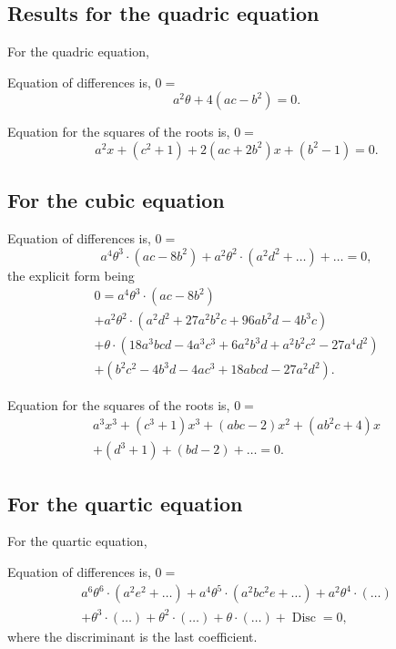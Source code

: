 \documentclass[11pt,a4paper]{article}
\theoremstyle{definition}
\DeclareMathOperator{\Disc}{Disc}
\begin{document}
\subsection*{Results for the quadric equation}

For the quadric equation,

Equation of differences is, $0=$
\[
a^2\theta+4(ac-b^2)=0.
\]

Equation for the squares of the roots is, $0=$
\[
a^2x+(c^2+1)+2(ac+2b^2)x+(b^2-1)=0.
\]

\subsection*{For the cubic equation}

Equation of differences is, $0=$
\[
a^4\theta^3\cdot(ac-8b^2)+a^2\theta^2\cdot(a^2d^2+\ldots)+\ldots=0,
\]
the explicit form being
\begin{multline*}
0=a^4\theta^3\cdot(ac-8b^2)\\
+a^2\theta^2\cdot(a^2d^2+27a^2b^2c+96ab^2d-4b^3c)\\
+\theta\cdot(18a^3bcd-4a^3c^3+6a^2b^3d+a^2b^2c^2-27a^4d^2)\\
+(b^2c^2-4b^3d-4ac^3+18abcd-27a^2d^2).
\end{multline*}

Equation for the squares of the roots is, $0=$
\begin{multline*}
a^3x^3+(c^3+1)x^3+(abc-2)x^2+(ab^2c+4)x\\
+(d^3+1)+(bd-2)+\ldots=0.
\end{multline*}

\subsection*{For the quartic equation}

For the quartic equation,

Equation of differences is, $0=$
\begin{multline*}
a^6\theta^6\cdot(a^2e^2+\ldots)+a^4\theta^5\cdot(a^2bc^2e+\ldots)+a^2\theta^4\cdot(\ldots)\\
+\theta^3\cdot(\ldots)+\theta^2\cdot(\ldots)+\theta\cdot(\ldots)+\Disc=0,
\end{multline*}
where the discriminant is the last coefficient.
\end{document}
